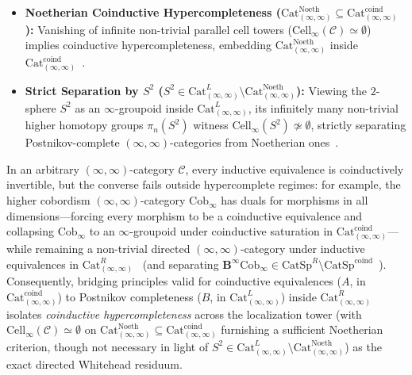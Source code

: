 \documentclass[10pt,twoside,openright]{book}
\theoremstyle{crmplain}
\theoremstyle{crmdef}
\theoremstyle{crmremark}
\begin{document}
\begin{itemize}[leftmargin=1.5em]

  \item \textbf{Noetherian Coinductive Hypercompleteness ($\mathrm{Cat}^{\mathrm{Noeth}}_{(\infty, \infty)} \subseteq \mathrm{Cat}^{\mathrm{coind}}_{(\infty, \infty)}$):} Vanishing of infinite non-trivial parallel cell towers ($\mathrm{Cell}_\infty(\mathcal{C}) \simeq \emptyset$) implies coinductive hypercompleteness, embedding $\mathrm{Cat}^{\mathrm{Noeth}}_{(\infty, \infty)}$ inside $\mathrm{Cat}^{\mathrm{coind}}_{(\infty, \infty)}$~\cite{Goldthorpe23,ORW26,GepnerHeine26}.

  \item \textbf{Strict Separation by $S^2$ ($S^2 \in \mathrm{Cat}^L_{(\infty, \infty)} \setminus \mathrm{Cat}^{\mathrm{Noeth}}_{(\infty, \infty)}$):} Viewing the $2$-sphere $S^2$ as an $\infty$-groupoid inside $\mathrm{Cat}^L_{(\infty, \infty)}$, its infinitely many non-trivial higher homotopy groups $\pi_n(S^2)$ witness $\mathrm{Cell}_\infty(S^2) \not\simeq \emptyset$, strictly separating Postnikov-complete $(\infty, \infty)$-categories from Noetherian ones~\cite{ORW26,GepnerHeine26}.

\end{itemize}

In an arbitrary $(\infty, \infty)$-category $\mathcal{C}$, every inductive equivalence is coinductively invertible, but the converse fails outside hypercomplete regimes: for example, the higher cobordism $(\infty, \infty)$-category $\mathrm{Cob}_\infty$ has duals for morphisms in all dimensions---forcing every morphism to be a coinductive equivalence and collapsing $\mathrm{Cob}_\infty$ to an $\infty$-groupoid under coinductive saturation in $\mathrm{Cat}^{\mathrm{coind}}_{(\infty, \infty)}$---while remaining a non-trivial directed $(\infty, \infty)$-category under inductive equivalences in $\mathrm{Cat}^R_{(\infty, \infty)}$~\cite{ORW26,GepnerHeine26} (and separating $\mathbf{B}^\infty \mathrm{Cob}_\infty \in \mathrm{CatSp}^R \setminus \mathrm{CatSp}^{\mathrm{coind}}$~\cite{Masuda26,Heine26}). Consequently, bridging principles valid for coinductive equivalences ($A$, in $\mathrm{Cat}^{\mathrm{coind}}_{(\infty, \infty)}$) to Postnikov completeness ($B$, in $\mathrm{Cat}^L_{(\infty, \infty)}$) inside $\mathrm{Cat}^R_{(\infty, \infty)}$ isolates \emph{coinductive hypercompleteness} across the localization tower (with $\mathrm{Cell}_\infty(\mathcal{C}) \simeq \emptyset$ on $\mathrm{Cat}^{\mathrm{Noeth}}_{(\infty, \infty)} \subseteq \mathrm{Cat}^{\mathrm{coind}}_{(\infty, \infty)}$ furnishing a sufficient Noetherian criterion, though not necessary in light of $S^2 \in \mathrm{Cat}^L_{(\infty, \infty)} \setminus \mathrm{Cat}^{\mathrm{Noeth}}_{(\infty, \infty)}$) as the exact directed Whitehead residuum.
\end{document}
